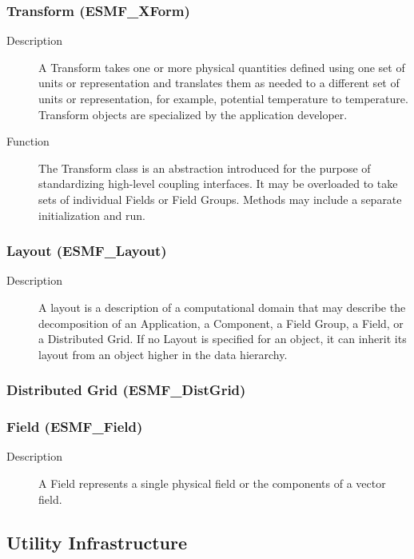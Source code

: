 \subsubsection{Transform (ESMF\_XForm)} 
\begin{description}
\item [Description] A Transform takes one or more physical quantities defined using one set 
of units or representation
and translates them as needed to a different set of units or representation, for example, 
potential temperature
to temperature.  Transform objects are specialized by the application developer.
\item [Function] The Transform class is an abstraction introduced for the
purpose of standardizing high-level coupling interfaces.  It may be overloaded
to take sets of individual Fields or Field Groups.  Methods may include a
separate initialization and run. 
\end{description}

\subsubsection{Layout (ESMF\_Layout)}
\label{sec:layout} 
\begin{description}
\item [Description] A layout is a description of a computational domain that
may describe the decomposition of an Application, a Component, a Field Group, a Field, or 
a Distributed Grid.
If no Layout is specified for an object, it can inherit its layout from an object
higher in the data hierarchy.  
\end{description}

\subsubsection{Distributed Grid (ESMF\_DistGrid)} 

\subsubsection{Field (ESMF\_Field)}
\begin{description} 
\item [Description] A Field represents a single physical field or the components of a 
vector field.  
\end{description}

\subsection{Utility Infrastructure}

